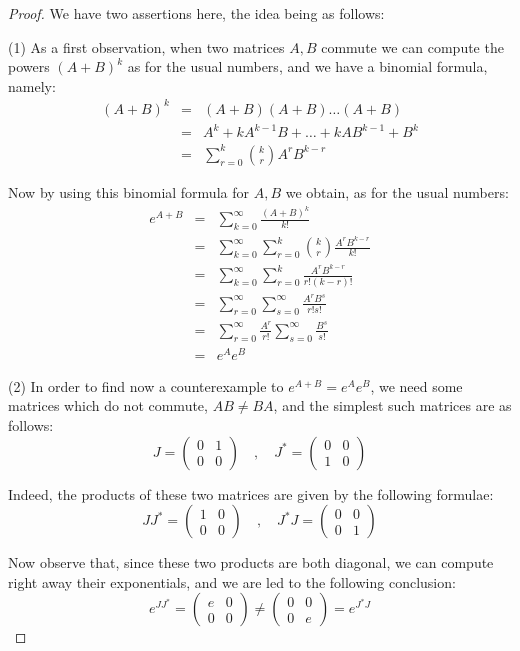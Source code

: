 \documentclass[12pt]{amsbook}
\begin{document}
\begin{proof}
We have two assertions here, the idea being as follows:

\medskip

(1) As a first observation, when two matrices $A,B$ commute we can compute the powers $(A+B)^k$ as for the usual numbers, and we have a binomial formula, namely:
\begin{eqnarray*}
(A+B)^k
&=&(A+B)(A+B)\ldots(A+B)\\
&=&A^k+kA^{k-1}B+\ldots+kAB^{k-1}+B^k\\
&=&\sum_{r=0}^k\binom{k}{r}A^rB^{k-r}
\end{eqnarray*}

Now by using this binomial formula for $A,B$ we obtain, as for the usual numbers:
\begin{eqnarray*}
e^{A+B}
&=&\sum_{k=0}^\infty\frac{(A+B)^k}{k!}\\
&=&\sum_{k=0}^\infty\sum_{r=0}^k\binom{k}{r}\frac{A^rB^{k-r}}{k!}\\
&=&\sum_{k=0}^\infty\sum_{r=0}^k\frac{A^rB^{k-r}}{r!(k-r)!}\\
&=&\sum_{r=0}^\infty\sum_{s=0}^\infty\frac{A^rB^s}{r!s!}\\
&=&\sum_{r=0}^\infty\frac{A^r}{r!}\sum_{s=0}^\infty\frac{B^s}{s!}\\
&=&e^Ae^B
\end{eqnarray*}

(2) In order to find now a counterexample to $e^{A+B}=e^Ae^B$, we need some matrices which do not commute, $AB\neq BA$, and the simplest such matrices are as follows:
$$J=\begin{pmatrix}0&1\\0&0\end{pmatrix}\quad,\quad J^*=\begin{pmatrix}0&0\\1&0\end{pmatrix}$$

Indeed, the products of these two matrices are given by the following formulae:
$$JJ^*=\begin{pmatrix}1&0\\0&0\end{pmatrix}\quad,\quad J^*J=\begin{pmatrix}0&0\\0&1\end{pmatrix}$$

Now observe that, since these two products are both diagonal, we can compute right away their exponentials, and we are led to the following conclusion:
$$e^{JJ^*}=\begin{pmatrix}e&0\\0&0\end{pmatrix}\neq 
\begin{pmatrix}0&0\\0&e\end{pmatrix}=e^{J^*J}$$


\end{proof}
\end{document}
